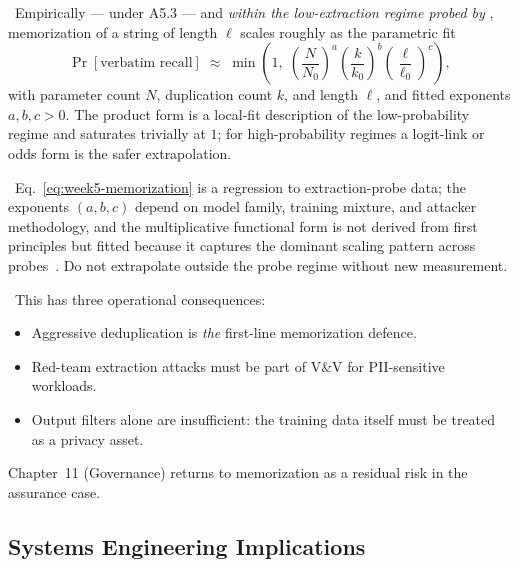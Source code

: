 \Emp\ Empirically — under A5.3 — and \emph{within the
low-extraction regime probed by} \citet{carlini2023quantifying},
memorization of a string of length $\ell$ scales roughly as the
parametric fit
\begin{equation}
\label{eq:week5-memorization}
\Pr[\text{verbatim recall}]
  \;\approx\; \min\!\left(1,\;
              \left(\frac{N}{N_0}\right)^{a}
              \left(\frac{k}{k_0}\right)^{b}
              \left(\frac{\ell}{\ell_0}\right)^{c}\right),
\end{equation}
with parameter count $N$, duplication count $k$, and length $\ell$,
and fitted exponents $a, b, c > 0$. The product form is a
local-fit description of the low-probability regime and saturates
trivially at $1$; for high-probability regimes a logit-link or odds
form is the safer extrapolation.

\Assum\ Eq.~\eqref{eq:week5-memorization} is a regression to
extraction-probe data; the exponents $(a, b, c)$ depend on model
family, training mixture, and attacker methodology, and the
multiplicative functional form is not derived from first principles
but fitted because it captures the dominant scaling pattern across
probes~\citep{carlini2023quantifying}. Do not extrapolate outside the
probe regime without new measurement.

\Cons\ This has three operational consequences:
\begin{itemize}
  \item Aggressive deduplication is \emph{the} first-line memorization
        defence.
  \item Red-team extraction attacks must be part of V\&V for
        PII-sensitive workloads.
  \item Output filters alone are insufficient: the training data
        itself must be treated as a privacy asset.
\end{itemize}
Chapter~11 (Governance) returns to memorization as a residual risk in
the assurance case.

\subsection{Systems Engineering Implications}

